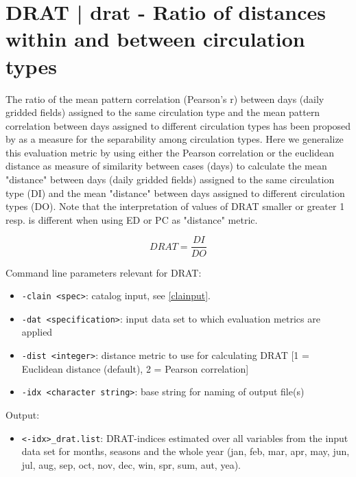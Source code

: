 \documentclass[12pt, oneside, a4paper, headsepline, plainheadsepline]{scrbook}
\begin{document}
\section{DRAT | drat - Ratio of distances within and between circulation types}

The ratio of the mean pattern correlation (Pearson's r) between days (daily gridded fields) assigned to the same circulation type and the mean pattern correlation between days assigned to different circulation types has been proposed by  \citet{Huth1996} as a measure for the separability among circulation types. Here we generalize this evaluation metric by using either the Pearson correlation or the euclidean distance as measure of similarity between cases (days) to calculate the mean "distance" between days (daily gridded fields) assigned to the same circulation type (DI) and the mean "distance" between days assigned to different circulation types (DO). Note that the interpretation of values of DRAT smaller or greater 1 resp. is different when using ED or PC as "distance" metric.

\begin{equation}
DRAT = \frac{DI}{DO}
\end{equation}

Command line parameters relevant for DRAT:
\begin{itemize}
\item \verb+-clain <spec>+:  catalog input, see \ref{clainput}.
\item \verb+-dat <specification>+: input data set to which evaluation metrics are applied
\item \verb+-dist <integer>+: distance metric to use for calculating DRAT [1 = Euclidean distance (default), 2 = Pearson correlation]
\item  \verb+-idx <character string>+: base string for naming of output file(s)
\end{itemize}

Output:
\begin{itemize}
\item \verb+<-idx>_drat.list+: DRAT-indices estimated over all variables from the input data set for months, seasons and the whole year (jan, feb, mar, apr, may, jun, jul, aug, sep, oct, nov, dec, win, spr, sum, aut, yea). 
 \end{itemize}
 
 
\end{document}
